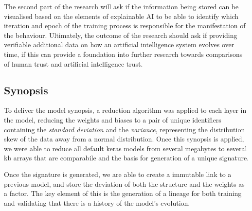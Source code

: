  The second part of the research will ask if the
information being stored can be visualised based on the elements of explainable
AI to be able to identify which iteration and epoch of the training process is
responsible for the manifestation of the behaviour. Ultimately, the outcome of
the research should ask if providing verifiable additional data on how an
artificial intelligence system evolves over time, if this can provide a
foundation into further research towards comparisons of human trust and
artificial intelligence trust.

\subsection{Synopsis}
To deliver the model synopsis, a reduction algorithm was applied to each layer in the model, reducing the weights and biases to a pair of unique identifiers containing the \textit{standard deviation} and the \textit{variance}, representing the distribution skew of the data away from a normal distribution. Once this synopsis is applied, we were able to reduce all default keras models from several megabytes to several kb arrays that are comparabile and the basis for generation of a unique signature.

Once the signature is generated, we are able to create a immutable link to a previous model, and store the deviation of both the structure and the weights as a factor. The key element of this is the generation of a lineage for both training and validating that there is a history of the model's evolution.